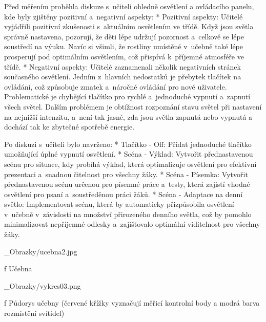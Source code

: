 \medskip\noindent
Před měřením proběhla diskuze s~učiteli ohledně osvětlení a ovládacího panelu, kde byly zjištěny pozitivní a~negativní aspekty:
\begitems
    * {\sbf Pozitivní aspekty:}
    Učitelé vyjádřili pozitivní zkušenosti s~aktuálním osvětlením ve třídě. Když jsou světla správně nastavena,
    pozorují, že děti lépe udržují pozornost a~celkově se lépe soustředí na výuku. Navíc si všimli, že rostliny
    umístěné v~učebně také lépe prosperují pod optimálním osvětlením, což přispívá k~příjemné atmosféře ve třídě.
    \medskip
    * {\sbf Negativní aspekty:}
    Učitelé zaznamenali několik negativních stránek současného osvětlení. Jedním z~hlavních nedostatků je přebytek
    tlačítek na ovládání, což způsobuje zmatek a~náročné ovládání pro nové uživatele. Problematické je chybějící
    tlačítko pro rychlé a~jednoduché vypnutí a~zapnutí všech světel. Dalším problémem je obtížnost rozpoznání
    stavu světel při nastavení na nejnižší intenzitu, a~není tak jasné, zda jsou světla zapnutá nebo vypnutá
    a dochází tak ke zbytečné spotřebě energie.
\enditems

\medskip\noindent
Po diskuzi s~učiteli bylo navrženo:
\begitems
    * {\sbf Tlačítko - Off:} Přidat jednoduché tlačítko umožňující úplné vypnutí osvětlení.
    * {\sbf Scéna - Výklad:} Vytvořit přednastavenou scénu pro situace, kdy probíhá výklad, která optimalizuje
        osvětlení pro efektivní prezentaci a~snadnou čitelnost pro všechny žáky.
    * {\sbf Scéna - Písemka:} Vytvořit přednastavenou scénu určenou pro písemné práce a~testy, která
        zajistí vhodné osvětlení pro psaní a~soustředěnou práci žáků.
    * {\sbf Scéna - Adaptace na denní světlo:} Implementovat scénu, která by automaticky přizpůsobila
        osvětlení v~učebně v~závislosti na množství přirozeného denního světla, což by pomohlo minimalizovat
        nepříjemné odlesky a~zajišťovalo optimální viditelnost pro všechny žáky.
\enditems

\medskip {}
\picw=8cm _Obrazky/ucebna2.jpg
\caption/f Učebna
\medskip

\medskip {}
\picw=15cm _Obrazky/vykres03.png
\caption/f Půdorys učebny (červené křížky vyznačují měřicí kontrolní body a modrá barva rozmístění svítidel)
\medskip






